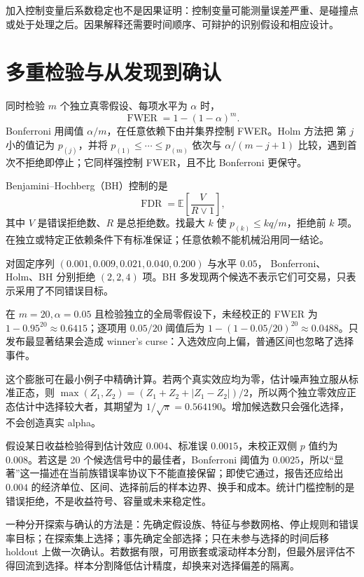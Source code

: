 加入控制变量后系数稳定也不是因果证明：控制变量可能测量误差严重、是碰撞点或处于处理之后。因果解释还需要时间顺序、可辩护的识别假设和相应设计。

\section{多重检验与从发现到确认}

同时检验 $m$ 个独立真零假设、每项水平为 $\alpha$ 时，
\[
 \operatorname{FWER}=1-(1-\alpha)^m.
\]
Bonferroni 用阈值 $\alpha/m$，在任意依赖下由并集界控制 FWER。Holm 方法把
第 $j$ 小的值记为 $p_{(j)}$，并将
$p_{(1)}\le\cdots\le p_{(m)}$ 依次与
$\alpha/(m-j+1)$ 比较，遇到首次不拒绝即停止；它同样强控制 FWER，且不比 Bonferroni 更保守。



Benjamini--Hochberg（BH）控制的是
\[
 \operatorname{FDR}=\mathbb E\!\left[\frac{V}{R\vee1}\right],
\]
其中 $V$ 是错误拒绝数、$R$ 是总拒绝数。找最大 $k$ 使
$p_{(k)}\le kq/m$，拒绝前 $k$ 项。在独立或特定正依赖条件下有标准保证；任意依赖不能机械沿用同一结论。

对固定序列 $(0.001,0.009,0.021,0.040,0.200)$ 与水平 $0.05$，
Bonferroni、Holm、BH 分别拒绝 $(2,2,4)$ 项。BH 多发现两个候选不表示它们可交易，只表示采用了不同错误目标。

在 $m=20,\alpha=0.05$ 且检验独立的全局零假设下，未经校正的 FWER 为 $1-0.95^{20}\approx0.6415$；逐项用 $0.05/20$ 阈值后为 $1-(1-0.05/20)^{20}\approx0.0488$。只发布最显著结果会造成 winner's curse：入选效应向上偏，普通区间也忽略了选择事件。

这个膨胀可在最小例子中精确计算。若两个真实效应均为零，估计噪声独立服从标准正态，则
$\max(Z_1,Z_2)=(Z_1+Z_2+|Z_1-Z_2|)/2$，所以两个独立零效应正态估计中选择较大者，其期望为 $1/\sqrt\pi=0.564190$。增加候选数只会强化选择，不会创造真实 alpha。


假设某日收益检验得到估计效应 $0.004$、标准误 $0.0015$，未校正双侧 $p$ 值约为 $0.008$。若这是 20 个候选信号中的最佳者，Bonferroni 阈值为 $0.0025$，所以“显著”这一描述在当前族错误率协议下不能直接保留；即使它通过，报告还应给出 $0.004$ 的经济单位、区间、选择前后的样本边界、换手和成本。统计门槛控制的是错误拒绝，不是收益符号、容量或未来稳定性。


一种分开探索与确认的方法是：先确定假设族、特征与参数网格、停止规则和错误率目标；在探索集上选择；事先确定全部选择；只在未参与选择的时间后移 holdout 上做一次确认。若数据有限，可用嵌套或滚动样本分割，但最外层评估不得回流到选择。样本分割降低估计精度，却换来对选择偏差的隔离。

